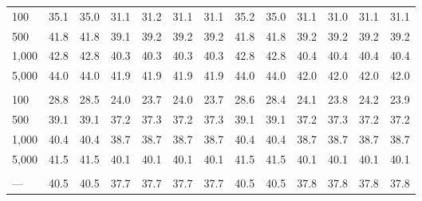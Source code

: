 \documentclass[AMA,STIX1COL,doublespace]{WileyNJD-v2}
\begin{document}
\begin{table}
\begin{tabular}[t]{lcccccccccccc}
\hline
\hspace{1em}100 & 35.1 & 35.0 & 31.1 & 31.2 & 31.1 & 31.1 & 35.2 & 35.0 & 31.1 & 31.0 & 31.1 & 31.1\\
\hspace{1em}500 & 41.8 & 41.8 & 39.1 & 39.2 & 39.2 & 39.2 & 41.8 & 41.8 & 39.2 & 39.2 & 39.2 & 39.2\\
\hspace{1em}1,000 & 42.8 & 42.8 & 40.3 & 40.3 & 40.3 & 40.3 & 42.8 & 42.8 & 40.4 & 40.4 & 40.4 & 40.4\\
\hspace{1em}5,000 & 44.0 & 44.0 & 41.9 & 41.9 & 41.9 & 41.9 & 44.0 & 44.0 & 42.0 & 42.0 & 42.0 & 42.0\\
\addlinespace[0.75em]
\multicolumn{13}{l}{\textbf{10 predictors, 490 junk}}\\
\hline
\hspace{1em}100 & 28.8 & 28.5 & 24.0 & 23.7 & 24.0 & 23.7 & 28.6 & 28.4 & 24.1 & 23.8 & 24.2 & 23.9\\
\hspace{1em}500 & 39.1 & 39.1 & 37.2 & 37.3 & 37.2 & 37.3 & 39.1 & 39.1 & 37.2 & 37.3 & 37.2 & 37.2\\
\hspace{1em}1,000 & 40.4 & 40.4 & 38.7 & 38.7 & 38.7 & 38.7 & 40.4 & 40.4 & 38.7 & 38.7 & 38.7 & 38.7\\
\hspace{1em}5,000 & 41.5 & 41.5 & 40.1 & 40.1 & 40.1 & 40.1 & 41.5 & 41.5 & 40.1 & 40.1 & 40.1 & 40.1\\
\addlinespace[0.75em]
\multicolumn{13}{l}{\textbf{Overall}}\\
\hline
\hspace{1em}--- & 40.5 & 40.5 & 37.7 & 37.7 & 37.7 & 37.7 & 40.5 & 40.5 & 37.8 & 37.8 & 37.8 & 37.8\\
\bottomrule
\end{tabular}
\end{table}
\end{document}
